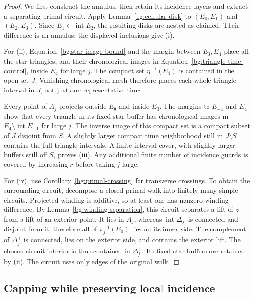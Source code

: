 \begin{proof}
We first construct the annulus, then retain its incidence layers and
extract a separating primal circuit.
Apply Lemma~\ref{bg:cellular-disk} to $(E_0,E_1)$ and $(E_2,E_3)$.
Since $E_1\subset\operatorname{int}E_2$, the resulting disks are
nested as claimed. Their difference is an annulus; the displayed
inclusions give (i).

For (ii), Equation~\ref{bg:star-image-bound} and the margin between
$E_3,E_4$ place all the star triangles, and their chronological
images in Equation~\ref{bg:triangle-time-control}, inside $E_4$ for
large $j$. The compact set $\eta^{-1}(E_4)$ is contained in the open
set $J$. Vanishing chronological mesh therefore places each whole
triangle interval in $J$, not just one representative time.

Every point of $A_j$ projects outside $E_0$ and inside $E_3$.
The margins to $E_{-1}$ and $E_4$ show that every triangle in its
fixed star buffer has chronological images in
$E_4\setminus\operatorname{int}E_{-1}$ for large $j$. The inverse
image of this compact set is a compact subset of $J$ disjoint from
$S$. A slightly larger compact time neighborhood still in
$J\setminus S$ contains the full triangle intervals. A finite
interval cover, with slightly larger buffers still off $S$, proves
(iii). Any additional finite number of incidence guards is covered
by increasing $r$ before taking $j$ large.

For (iv), use Corollary~\ref{bg:primal-crossing} for transverse
crossings. To obtain the surrounding circuit, decompose a closed primal
walk into finitely many simple circuits. Projected winding is additive,
so at least one has nonzero winding difference. By
Lemma~\ref{bg:winding-separation}, this circuit separates a lift
of $z$ from a lift of an exterior point. It lies in $A_j$, whereas
$\operatorname{int}\Delta_j^-$ is connected and disjoint from it;
therefore all of $\pi_j^{-1}(E_0)$ lies on its inner side. The
complement of $\Delta_j^+$ is connected, lies on the exterior side,
and contains the exterior lift. The chosen circuit interior is
thus contained in $\Delta_j^+$. Its fixed star buffers are retained
by (ii). The circuit uses only edges of the original walk.
\end{proof}

\subsection{Capping while preserving local incidence}

